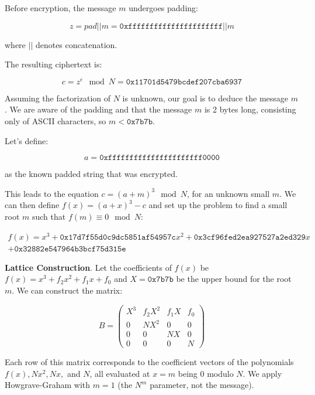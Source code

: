\documentclass[a4paper,12pt]{report}
\begin{document}
Before encryption, the message $m$ undergoes padding:

\[
    z = pad || m = \texttt{0xffffffffffffffffffffff} || m
\]

where $||$ denotes concatenation.

The resulting ciphertext is:

\[
    c = z^e \mod N = \texttt{0x11701d5479bcdef207cba6937}
\]

Assuming the factorization of $N$ is unknown, our goal is to deduce the message $m$. We are aware of the padding and that the message $m$ is 2 bytes long, consisting only of ASCII characters, so $m < \texttt{0x7b7b}$.

\vspace*{10px}

Let's define:

\[
    a = \texttt{0xffffffffffffffffffffff0000}
\] 

as the known padded string that was encrypted.

\vspace*{10px}

This leads to the equation $c = (a + m)^3 \mod N$, for an unknown small $m$. We can then define $f(x) = (a + x)^3 - c$ and set up the problem to find a small root $m$ such that $f(m) \equiv 0 \mod N$:

\begin{align*}
    f(x) = x^3 + \texttt{0x17d7f55d0c9dc5851af54957c}x^2 + \texttt{0x3cf96fed2ea927527a2ed329}x\\
    + \texttt{0x32882e547964b3bcf75d315e}
\end{align*}

\vspace*{10px}

\textbf{Lattice Construction}. Let the coefficients of $f(x)$ be $f(x) = x^3 + f_2x^2 + f_1x + f_0$ and $X = \texttt{0x7b7b}$ be the upper bound for the root $m$. We can construct the matrix:

\[
B = 
\label{mat:lattice_rsa}
\begin{pmatrix}
    X^3 & f_2X^2 & f_1X & f_0 \\
    0 & NX^2 & 0 & 0 \\
    0 & 0 & NX & 0 \\
    0 & 0 & 0 & N
\end{pmatrix}
\] 

Each row of this matrix corresponds to the coefficient vectors of the polynomials $f(x), Nx^2, Nx,$ and $N$, all evaluated at $x = m$ being 0 modulo $N$.
We apply Howgrave-Graham with $m=1$ (the $N^m$ parameter, not the message).
\end{document}
